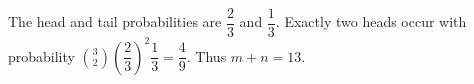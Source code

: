 The head and tail probabilities are $\dfrac{2}{3}$ and $\dfrac{1}{3}$. Exactly two heads occur with probability $\binom32(\dfrac{2}{3})^2\dfrac{1}{3}=\dfrac{4}{9}$. Thus $\boxed{m+n=13}$.
